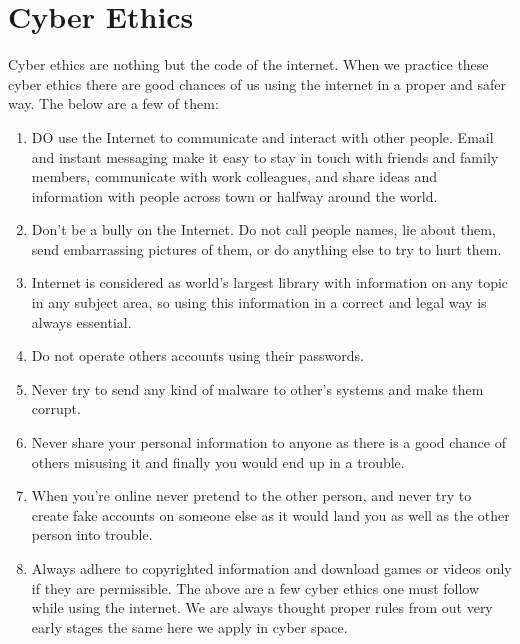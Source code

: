 \section{Cyber Ethics}
\hspace{0.3in}Cyber ethics are nothing but the code of the 
internet. When we practice these cyber ethics 
there are good chances of us using the internet 
in a proper and safer way. The below are a few 
of them:
\begin{enumerate}
	\item DO use the Internet to communicate 
	and interact with other people. Email 
	and instant messaging make it easy to 
	stay in touch with friends and family 
	members, communicate with work 
	colleagues, and share ideas and 
	information with people across town or 
	halfway around the world.
	\item Don’t be a bully on the Internet. Do not 
	call people names, lie about them, send 
	embarrassing pictures of them, or do 
	anything else to try to hurt them.
	\item Internet is considered as world’s largest 
	library with information on any topic in 
	any subject area, so using this 
	information in a correct and legal way 
	is always essential.
	\item Do not operate others accounts using 
	their passwords. 
	\item Never try to send any kind of malware 
	to other’s systems and make them 
	corrupt.
	\item Never share your personal information 
	to anyone as there is a good chance of 
	others misusing it and finally you 
	would end up in a trouble.
	\item When you’re online never pretend to 
	the other person, and never try to create 
	fake accounts on someone else as it 
	would land you as well as the other 
	person into trouble.
	\item Always adhere to copyrighted 
	information and download games or 
	videos only if they are permissible.
	The above are a few cyber ethics one must 
	follow while using the internet. We are always 
	thought proper rules from out very early stages 
	the same here we apply in cyber space.
\end{enumerate}








